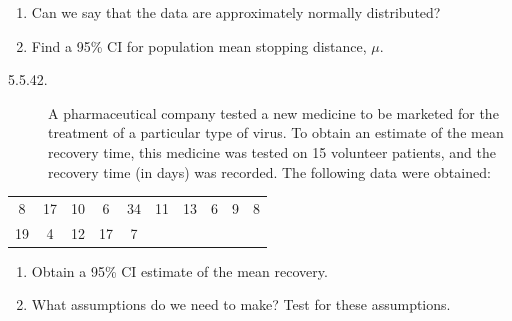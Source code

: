 \begin{enumerate}
\item[(a)] Can we say that the data are approximately normally distributed?
\item[(b)] Find a 95\% CI for population mean stopping distance, $\mu$.
\end{enumerate}

\begin{description}
\item[5.5.42.] A pharmaceutical company tested a new medicine to be marketed for the treatment of a particular type of virus. To obtain an estimate of the mean recovery time, this medicine was tested on 15 volunteer patients, and the recovery time (in days) was recorded. The following data were obtained:
\end{description}

\begin{center}
\begin{tabular}{cccccccccc}
8 & 17 & 10 & 6 & 34 & 11 & 13 & 6 & 9 & 8 \\
19 & 4 & 12 & 17 & 7 & & & & &
\end{tabular}
\end{center}

\begin{enumerate}
\item[(a)] Obtain a 95\% CI estimate of the mean recovery.
\item[(b)] What assumptions do we need to make? Test for these assumptions.
\end{enumerate}
